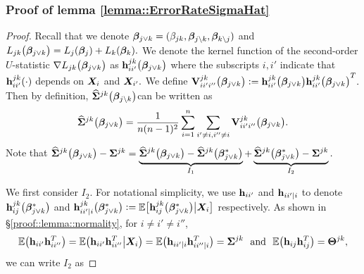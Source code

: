 \documentclass[twoside,11pt]{article}
\newcommand{\defeq}{\vcentcolon=}
\newcommand*{\bbetas}{\bbeta^*}
\newcommand*{\hSigma}{\hat{\bSigma}}
\begin{document}
\subsubsection{Proof of lemma \ref{lemma::ErrorRateSigmaHat}}\label{proof::lemma::ErrorRateSigmaHat}

\begin{proof} 
Recall that we denote  $\bm{\beta}_{j\vee k} = (\beta_{jk},\bm{\beta}_{j\setminus k},\bm{\beta}_{k\setminus j})$  and $L_{jk}\bigl(\bm{\beta}_{j\vee k}\bigr) = L_j(\bm{\beta}_j) + L_k(\bm{\beta}_k).$ We denote the kernel function of the second-order $U$-statistic $\nabla L_{jk}\bigl( \bm{\beta}_{j\vee k}\bigr)$ as $\mathbf{h}_{ii'}^{jk}\bigl(\bm{\beta}_{ j\vee k}\bigr)$ where the subscripts $i,i'$ indicate that $\mathbf{h}_{ii'}^{jk}(\cdot)$ depends on $\bm{X}_i$ and $\bm{X}_{i'}.$
We define $\Vb_{ii'i''}^{jk}\bigl(\bbeta_{ j\vee k}\bigr) \defeq \hb_{ii'}^{jk}\bigl(\bbeta_{ j\vee k}\bigr) {\hb_{ii'}^{jk}\bigl(\bbeta_{ j\vee k}\bigr) }^T .$
Then by definition,  $\hSigma^{jk}\bigl(\bbeta_{j\setminus k}\bigr)$can be written as
$$
\hSigma^{jk}\bigl(\bbeta_{j\vee k}\bigr)= \frac{1}{n(n-1)^2} \sum\limits_{i=1}^n \sum\limits_{i'\neq i, i''\neq i}\Vb_{ii'i''}^{jk}\bigl(\bbeta_{ j\vee k}\bigr).
$$
Note that $\hSigma^{jk}\bigl(\bbeta_{j\vee k}\bigr) - \bSigma ^{jk}= \underbrace{\hSigma^{jk}\bigl(\bbeta_{j\vee k}\bigr) - \hSigma^{jk}\bigl(\bbetas_{j\vee k}\bigr)}_{I_1} + \underbrace{   \hSigma^{jk}\bigl(\bbetas_{j\vee k}\bigr) - \bSigma^{jk}}_{I_2}.$

We first consider  $I_2.$ For notational simplicity, we use $\mathbf{h}_{ii'}$ and $\mathbf{h}_{ii'\mid i}$ to denote $\hb_{ij}^{jk}\bigl(\bbetas_{j\vee k}\bigr)$ and $\hb_{ii'\mid i}^{jk}\bigl(\bbetas_{j\vee k}\bigr) \defeq \EE \bigl [\hb_{ij}^{jk}\bigl(\bbetas_{j\vee k}\bigr) \big| \bX_i \bigr]$ respectively. As shown in \S\ref{proof::lemma::normality},   for $i\neq i'\neq i''$, 
$$\mathbb{E}\bigl( \mathbf{h}_{ii'}\mathbf{h}_{ii''}^T\bigr) =\mathbb{E}\bigl (\mathbf{h}_{ii'}\mathbf{h}_{ii''}^T\big |\bm{X}_i\bigr)= \mathbb{E}\bigl (\mathbf{h}_{ii'\mid i} \mathbf{h}_{ii''\mid i}^T\bigr)= \bm{\Sigma}^{jk} ~~\text{and}~~\mathbb{E} \bigl (\mathbf{h}_{ij} \mathbf{h}_{ij} ^T \bigr ) = \bm{\Theta}^{jk},$$ 
we can write $I_2$ as 


\end{proof}
\end{document}
